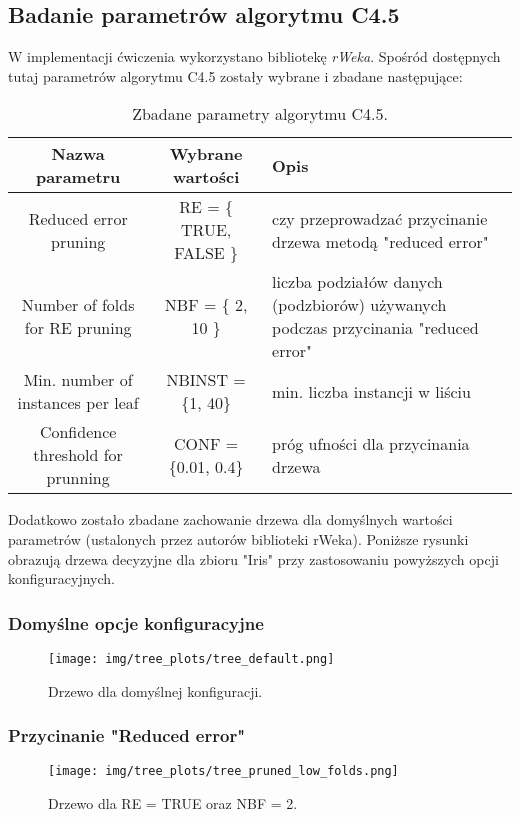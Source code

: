 \subsection{Badanie parametrów algorytmu C4.5}
  W implementacji ćwiczenia wykorzystano bibliotekę \textit{rWeka}. Spośród dostępnych
  tutaj parametrów algorytmu C4.5 zostały wybrane i zbadane następujące:

  \begin{table}[H]
    \begin{tabular}{|c|c|p{6cm}|}
      \hline
      \textbf{Nazwa parametru} & \textbf{Wybrane wartości} & \textbf{Opis} \\ \hline
      Reduced error pruning    &  RE = \{ TRUE, FALSE \}   & czy przeprowadzać przycinanie drzewa metodą "reduced error" \\ \hline
      Number of folds for RE pruning & NBF = \{ 2, 10 \}   & liczba podziałów danych (podzbiorów) używanych podczas przycinania "reduced error" \\ \hline
      Min. number of instances per leaf & NBINST = \{1, 40\}& min. liczba instancji w liściu \\ \hline
      Confidence threshold for prunning & CONF = \{0.01, 0.4\}& próg ufności dla przycinania drzewa \\ \hline
    \end{tabular}
    \caption{Zbadane parametry algorytmu C4.5.}
  \end{table}
  Dodatkowo zostało zbadane zachowanie drzewa dla domyślnych wartości parametrów (ustalonych przez autorów biblioteki rWeka).
  Poniższe rysunki obrazują drzewa decyzyjne dla zbioru "Iris" przy zastosowaniu powyższych opcji konfiguracyjnych.

  \subsubsection*{Domyślne opcje konfiguracyjne}
  \begin{figure}[H]
    \center
    \texttt{[image: img/tree\_plots/tree\_default.png]}
    \caption{Drzewo dla domyślnej konfiguracji.}
  \end{figure}

  \subsubsection*{Przycinanie "Reduced error"}
  \begin{figure}[H]
    \center
    \texttt{[image: img/tree\_plots/tree\_pruned\_low\_folds.png]}
    \caption{Drzewo dla RE = TRUE oraz NBF = 2.}
  \end{figure}

